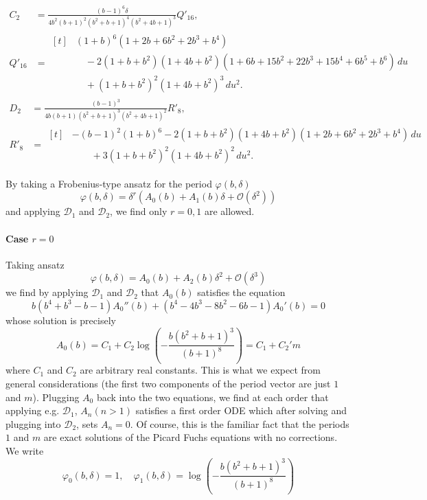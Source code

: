 \documentclass[11pt, a4paper]{article}
\numberwithin{equation}{section}
\begin{document}
% 
\begin{align}
  C_2 &= \frac{(b-1)^6 \delta}{4 b^2 (b+1)^2 \left(b^2+b+1\right)^4 \left(b^2+4 b+1\right)^3} Q'_{16}, \\[2mm]
  Q'_{16} &=
  \begin{aligned}[t]
    &(1+b)^{6}(1+2b+6b^{2}+2b^{3}+b^{4}) \nonumber\\
    &\quad -2(1+b+b^{2})(1+4b+b^{2})(1+6b+15b^{2}+22b^{3}+15b^{4}+6b^{5}+b^{6})\,du \nonumber\\
    &\quad + (1+b+b^{2})^{2}(1+4b+b^{2})^{3}\,du^{2}.
  \end{aligned}
\end{align}
%
\begin{align}
  D_2 &= \frac{(b-1)^3}{4 b (b+1) \left(b^2+b+1\right)^3 \left(b^2+4 b+1\right)^2} R'_8, \\[2mm]
  R'_8 &=
  \begin{aligned}[t]
    &-(b-1)^{2}(1+b)^{6}
    -2(1+b+b^{2})(1+4b+b^{2})(1+2b+6b^{2}+2b^{3}+b^{4})\,du \nonumber\\
    &\qquad + 3(1+b+b^{2})^{2}(1+4b+b^{2})^{2}\,du^{2}.
  \end{aligned}
\end{align}

By taking a Frobenius-type ansatz for the period $\varphi(b, \delta)$
\begin{equation}
  \varphi(b, \delta) = \delta^r (A_0(b) + A_1(b) \delta + \mathcal{O}(\delta^2))
\end{equation}
and applying $\mathcal{D}_1$ and $\mathcal{D}_2$, we find only $r = 0, 1$ are allowed.

\paragraph{Case $r = 0$}
Taking ansatz
\begin{equation}
  \varphi(b, \delta) = A_0(b) + A_2(b) \delta^2 + \mathcal{O}(\delta^3)
\end{equation}
we find by applying $\mathcal{D}_1$ and $\mathcal{D}_2$ that $A_0(b)$ satisfies the equation
\begin{equation}
  b \left(b^4+b^3-b-1\right) A_0''(b)+\left(b^4-4 b^3-8 b^2-6 b-1\right) A_0'(b) = 0
\end{equation}
whose solution is precisely
\begin{equation}
  A_0(b) = C_1 + C_2 \log(-\frac{b \left(b^2+b+1\right)^3}{(b+1)^8}) = C_1 + C_2' m
\end{equation}
where $C_1$ and $C_2$ are arbitrary real constants. This is what we expect from general considerations (the first two components of the period vector are just $1$ and $m$).
Plugging $A_0$ back into the two equations, we find at each order that applying e.g. $\mathcal{D}_1$, $A_n (n > 1)$ satisfies a first order ODE which after solving and plugging into $\mathcal{D}_2$, sets $A_n = 0$. Of course, this is the familiar fact that the periods $1$ and $m$ are exact solutions of the Picard Fuchs equations with no corrections.
We write
\begin{equation}
  \varphi_0(b, \delta) = 1, \quad \varphi_1(b, \delta) = \log(-\frac{b \left(b^2+b+1\right)^3}{(b+1)^8})
\end{equation}
\end{document}
